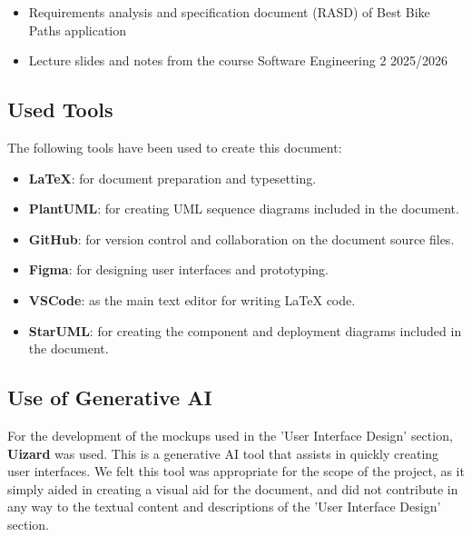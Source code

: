 \begin{itemize}
   \item Requirements analysis and specification document (RASD) of Best Bike Paths application
   \item Lecture slides and notes from the course Software Engineering 2 2025/2026
\end{itemize}

\subsection{Used Tools}
The following tools have been used to create this document:
\begin{itemize}
    \item \textbf{LaTeX}: for document preparation and typesetting.
    \item \textbf{PlantUML}: for creating UML sequence diagrams included in the document.
    \item \textbf{GitHub}: for version control and collaboration on the document source files.
    \item \textbf{Figma}: for designing user interfaces and prototyping.
    \item \textbf{VSCode}: as the main text editor for writing LaTeX code.
    \item \textbf{StarUML}: for creating the component and deployment diagrams included in the document.
\end{itemize}

\subsection{Use of Generative AI}
For the development of the mockups used in the 'User Interface Design' section, \textbf{Uizard} was used.
This is a generative AI tool that assists in quickly creating user interfaces. We felt this tool was appropriate 
for the scope of the project, as it simply aided in creating a visual aid for the document, and did not contribute 
in any way to the textual content and descriptions of the 'User Interface Design' section.